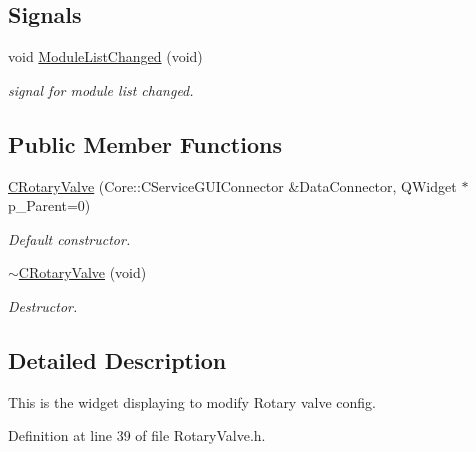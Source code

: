 \subsection*{\-Signals}
\begin{DoxyCompactItemize}
\item 
void \hyperlink{classSystemTracking_1_1CRotaryValve_a3af5a488ca2cfbc567fd403e74c27da4}{\-Module\-List\-Changed} (void)
\begin{DoxyCompactList}\small\item\em signal for module list changed. \end{DoxyCompactList}\end{DoxyCompactItemize}
\subsection*{\-Public \-Member \-Functions}
\begin{DoxyCompactItemize}
\item 
\hyperlink{classSystemTracking_1_1CRotaryValve_ad1ba1c8baaa57a937e855a27159c70d7}{\-C\-Rotary\-Valve} (\-Core\-::\-C\-Service\-G\-U\-I\-Connector \&\-Data\-Connector, \-Q\-Widget $\ast$p\-\_\-\-Parent=0)
\begin{DoxyCompactList}\small\item\em \-Default constructor. \end{DoxyCompactList}\item 
\hyperlink{classSystemTracking_1_1CRotaryValve_a5f2b89df50d4661fa6ee8fa777398dfd}{$\sim$\-C\-Rotary\-Valve} (void)
\begin{DoxyCompactList}\small\item\em \-Destructor. \end{DoxyCompactList}\end{DoxyCompactItemize}


\subsection{\-Detailed \-Description}
\-This is the widget displaying to modify \-Rotary valve config. 

\-Definition at line 39 of file \-Rotary\-Valve.\-h.



